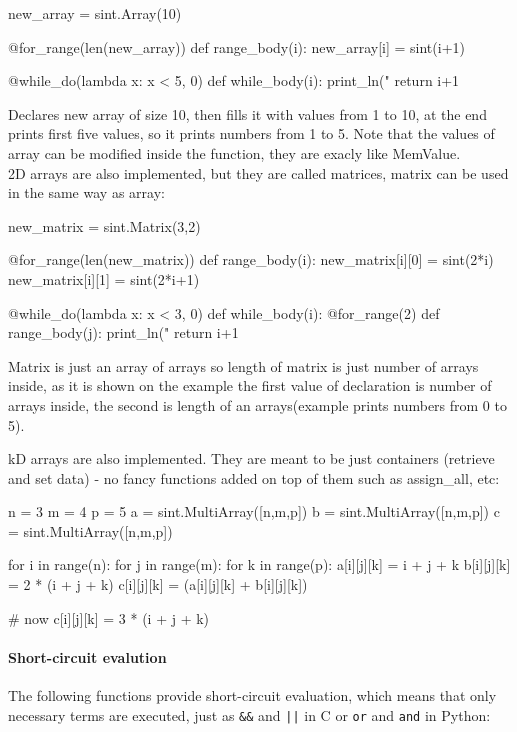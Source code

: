 \begin{mylisting}
new_array = sint.Array(10)

@for_range(len(new_array))
def range_body(i):
    new_array[i] = sint(i+1)

@while_do(lambda x: x < 5, 0)
def while_body(i):
    print_ln("%
    return i+1
\end{mylisting}
Declares new array of size 10, then fills it with values from 1 to 10, at the end prints first five values, so it prints numbers from 1 to 5. Note that the values of array can be modified inside the function, they are exacly like MemValue. \\
2D arrays are also implemented, but they are called matrices, matrix can be used in the same way as array:
\begin{mylisting}
new_matrix = sint.Matrix(3,2)

@for_range(len(new_matrix))
def range_body(i):
    new_matrix[i][0] = sint(2*i)
    new_matrix[i][1] = sint(2*i+1)

@while_do(lambda x: x < 3, 0)
def while_body(i):
    @for_range(2)
    def range_body(j):
        print_ln("%
    return i+1
\end{mylisting}
Matrix is just an array of arrays so length of matrix is just number of arrays inside, as it is shown on the example the first value of declaration is number of arrays inside, the second is length of an arrays(example prints numbers from 0 to 5).

kD arrays are also implemented. They are meant to be just containers (retrieve and set data) - no fancy functions added on top of them such as assign_all, etc:

\begin{mylisting}
n = 3
m = 4
p = 5
a = sint.MultiArray([n,m,p])
b = sint.MultiArray([n,m,p])
c = sint.MultiArray([n,m,p])

for i in range(n):
	for j in range(m):
		for k in range(p):
			a[i][j][k] = i + j + k
			b[i][j][k] = 2 * (i + j + k)
			c[i][j][k] = (a[i][j][k] + b[i][j][k])

# now c[i][j][k] = 3 * (i + j + k)
\end{mylisting}


\paragraph{Short-circuit evalution}
The following functions provide short-circuit evaluation, which means
that only necessary terms are executed, just as \verb+&&+ and
\verb+||+ in C or \verb+or+ and \verb+and+ in Python:

